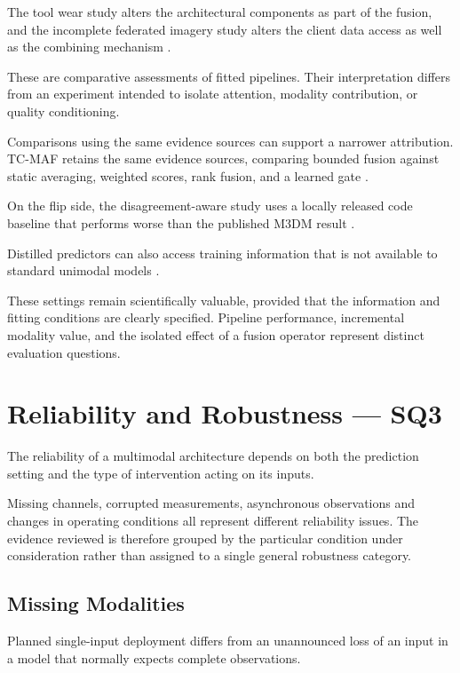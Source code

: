 The tool wear study alters the architectural components as part of the fusion, and the incomplete
federated imagery study alters the client data access as well as the combining mechanism
\parencite{P045,P051}.

These are comparative assessments of fitted pipelines. Their interpretation differs from an
experiment intended to isolate attention, modality contribution, or quality conditioning.

Comparisons using the same evidence sources can support a narrower attribution. TC-MAF retains the
same evidence sources, comparing bounded fusion against static averaging, weighted scores, rank
fusion, and a learned gate \parencite[PDF p.~7, Table~3]{P026}.

On the flip side, the disagreement-aware study uses a locally released code baseline that performs
worse than the published M3DM result \parencite[PDF p.~10, Table~4]{P033}.

Distilled predictors can also access training information that is not available to standard unimodal
models \parencite{Li2025PGMTKD}.

These settings remain scientifically valuable, provided that the information and fitting conditions
are clearly specified. Pipeline performance, incremental modality value, and the isolated effect of
a fusion operator represent distinct evaluation questions.

\section{Reliability and Robustness --- SQ3}

The reliability of a multimodal architecture depends on both the prediction setting and the type of
intervention acting on its inputs.

Missing channels, corrupted measurements, asynchronous observations and changes in operating
conditions all represent different reliability issues. The evidence reviewed is therefore grouped by
the particular condition under consideration rather than assigned to a single general robustness
category.

\subsection{Missing Modalities}

Planned single-input deployment differs from an unannounced loss of an input in a model that
normally expects complete observations.

